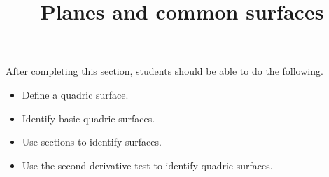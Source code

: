 \documentclass{ximera}
\title{Planes and common surfaces}
\begin{document}
\begin{abstract}
\end{abstract}

\maketitle

\begin{sectionOutcomes}

After completing this section, students should be able to do the following.

\begin{itemize}
\item Define a quadric surface.
\item Identify basic quadric surfaces.
\item Use sections to identify surfaces.
\item Use the second derivative test to identify quadric surfaces.
\end{itemize}

\end{sectionOutcomes}
\end{document}
